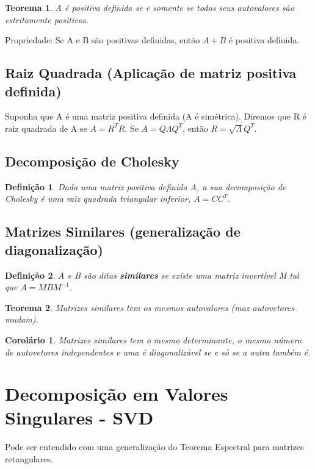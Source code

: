 \documentclass[12pt]{article}
\newtheorem{theorem}{Teorema}
\newtheorem{corollary}{Corolário}[theorem]
\newtheorem{definition}{Definição}
\begin{document}
\begin{theorem}
    A é positiva definida se e somente se todos seus autovalores são estritamente positivos.
\end{theorem}

Propriedade: Se A e B são positivas definidas, então $A + B$ é positiva definida.

\subsection*{Raiz Quadrada (Aplicação de matriz positiva definida)}
Suponha que A é uma matriz positiva definida (A é simétrica). Diremos que R é raiz quadrada de A se $A = R^T R$. Se $A = Q \Lambda Q^T$, então $R = \sqrt{\Lambda} Q^T$.

\subsection*{Decomposição de Cholesky}
\begin{definition}
    Dada uma matriz positiva definida A, a sua decomposição de Cholesky é uma raiz quadrada triangular inferior, $A = C C^T$.
\end{definition}

\subsection*{Matrizes Similares (generalização de diagonalização)}
\begin{definition}
    A e B são ditas \textbf{similares} se existe uma matriz invertível M tal que $A = M B M^{-1}$.
\end{definition}

\begin{theorem}
    Matrizes similares tem os mesmos autovalores (maz autovetores mudam).
\end{theorem}

\begin{corollary}
    Matrizes similares tem o mesmo determinante, o mesmo número de autovetores independentes e uma é diagonalizável se e só se a outra também é.
\end{corollary}

\section*{Decomposição em Valores Singulares - SVD}
Pode ser entendido com uma generalização do Teorema Espectral para matrizes retangulares.
\end{document}
